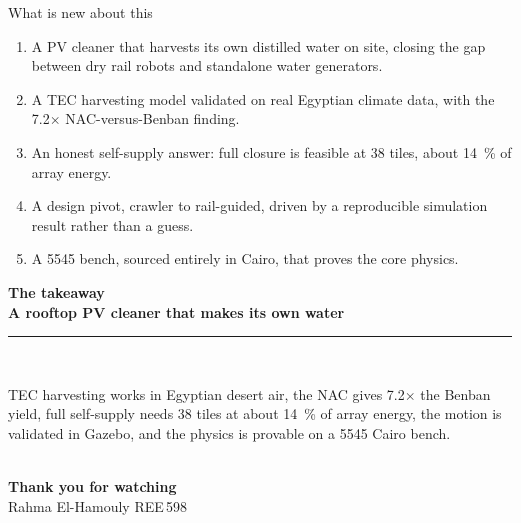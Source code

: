 \documentclass[aspectratio=169,10pt]{beamer}
\begin{document}
\begin{frame}{What is new about this}
  \begin{enumerate}\setlength\itemsep{0.5em}
    \item A PV cleaner that harvests its own distilled water on site, closing the gap between dry rail robots and standalone water generators.
    \item A TEC harvesting model validated on real Egyptian climate data, with the 7.2$\times$ NAC-versus-Benban finding.
    \item An honest self-supply answer: full closure is feasible at 38 tiles, about \SI{14}{\percent} of array energy.
    \item A design pivot, crawler to rail-guided, driven by a reproducible simulation result rather than a guess.
    \item A \SI{5545}{\EGP} bench, sourced entirely in Cairo, that proves the core physics.
  \end{enumerate}
\end{frame}

{
\begin{frame}
  \vfill
  \begin{center}
    {\color{nacsand}\large\bfseries The takeaway}\\[0.8em]
    {\color{white}\Large\bfseries A rooftop PV cleaner that makes its own water}\\[0.7em]
    {\color{nacteal}\rule{4cm}{2.5pt}}\\[0.8em]
    \begin{minipage}{0.82\textwidth}
      \color{white!90}\centering\small
      TEC harvesting works in Egyptian desert air, the NAC gives 7.2$\times$ the Benban yield, full self-supply needs 38 tiles at about \SI{14}{\percent} of array energy, the motion is validated in Gazebo, and the physics is provable on a \SI{5545}{\EGP} Cairo bench.
    \end{minipage}\\[1.4em]
    {\color{white}\large\bfseries Thank you for watching}\\[0.3em]
    {\color{white!75}\small Rahma El-Hamouly \quad{\textbullet}\quad REE\,598}
  \end{center}
  \vfill
\end{frame}}
\end{document}
